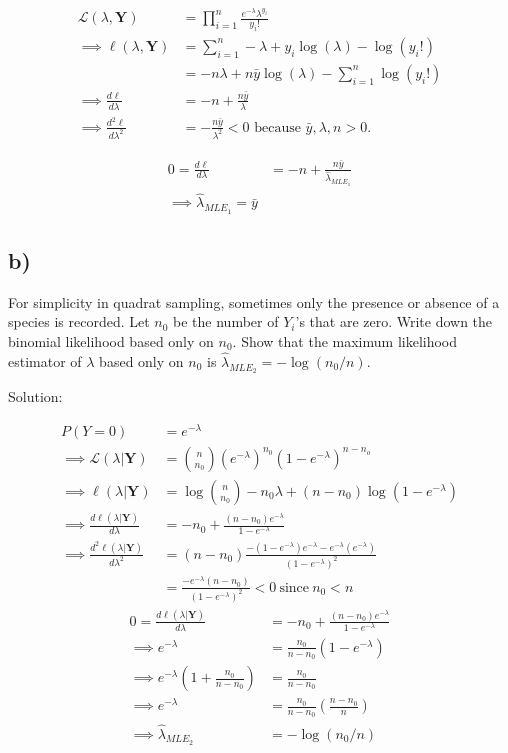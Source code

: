\documentclass[
  letterpaper,
  DIV=11,
  numbers=noendperiod]{scrreprt}
\begin{document}
\[ \begin{aligned}
\mathcal{L} (\lambda, \mathbf{Y}) &= \prod_{i=1}^n \frac{e^{-\lambda} \lambda^{y_i}}{y_i!} \\
\implies \ell (\lambda, \mathbf{Y}) &= \sum_{i=1}^n -\lambda + y_i\log(\lambda)- \log(y_i!) \\
&=  -n\lambda + n\bar{y}\log(\lambda)- \sum_{i=1}^n \log(y_i!) \\
\implies \frac{d \ell}{d \lambda} &= -n+ \frac{n\bar{y}}{\lambda} \\
\implies \frac{d^2 \ell}{d \lambda^2} &= -\frac{n\bar{y}}{\lambda^2}
 < 0 \text{ because } \bar{y}, \lambda, n >0.
 \end{aligned}
\]

\[ \begin{aligned}
0=\frac{d \ell}{d \lambda} &= -n+ \frac{n\bar{y}}{\hat{\lambda}_{MLE_1}}\\
\implies \hat{\lambda}_{MLE_1}= \bar{y}
\end{aligned}
\]

\hypertarget{b-1}{%
\subsection{b)}\label{b-1}}

For simplicity in quadrat sampling, sometimes only the presence or
absence of a species is recorded. Let \(n_0\) be the number of \(Y_i\)'s
that are zero. Write down the binomial likelihood based only on \(n_0\).
Show that the maximum likelihood estimator of \(\lambda\) based only on
\(n_0\) is \(\hat{\lambda}_{MLE_2}= -\log(n_0/n)\).

Solution:

\[
\begin{aligned}
P(Y=0)&= e^{-\lambda} \\
\implies \mathcal L (\lambda | \mathbf Y) &= {n \choose n_0} (e^{-\lambda})^{n_0}(1-e^{-\lambda})^{n-n_o} \\
\implies \ell (\lambda | \mathbf Y) &=\log{n \choose n_0}- n_0\lambda+(n-n_0)\log(1-e^{-\lambda}) \\
\implies \frac{ d\ell (\lambda | \mathbf Y)}{d \lambda} &= - n_0+\frac{(n-n_0)e^{-\lambda}}{1-e^{-\lambda}} \\
\implies \frac{ d^2 \ell (\lambda | \mathbf Y)}{d \lambda^2} &=  (n-n_0) \frac{-(1-e^{-\lambda})e^{-\lambda} -e^{-\lambda}(e^{-\lambda})}{(1-e^{-\lambda})^2} \\
&=  \frac{-e^{-\lambda}(n-n_0)}{(1-e^{-\lambda})^2} < 0 ~\text{since}~ n_0<n
\end{aligned}
\] \[
\begin{aligned}
0= \frac{ d\ell (\lambda | \mathbf Y)}{d \lambda} &= - n_0+\frac{(n-n_0)e^{-\lambda}}{1-e^{-\lambda}} \\
\implies e^{-\lambda} &= \frac{n_0}{n-n_0}(1-e^{-\lambda}) \\
\implies e^{-\lambda} \left(1+ \frac{n_0}{n-n_0} \right) &= \frac{n_0}{n-n_0} \\
\implies e^{-\lambda}  &= \frac{n_0}{n-n_0}\left(\frac{n-n_0}{n} \right) \\
\implies \hat{\lambda}_{MLE_2} &= -\log(n_0/n)
\end{aligned}
\]
\end{document}
